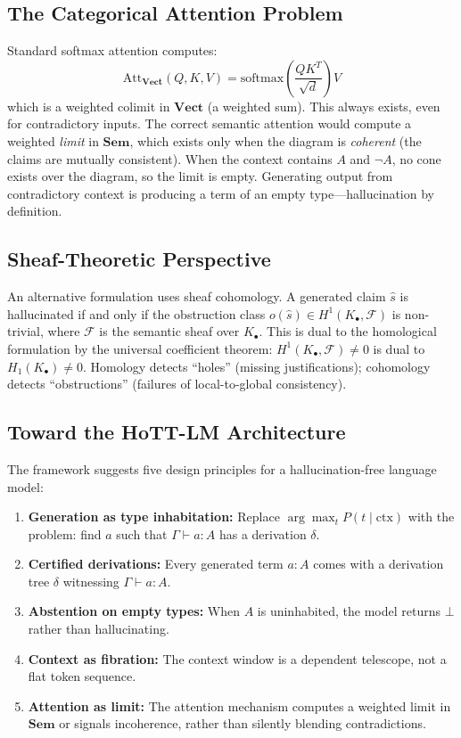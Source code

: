 \documentclass[11pt,a4paper]{article}
\theoremstyle{plain}
\theoremstyle{definition}
\theoremstyle{remark}
\newcommand{\Sem}{\mathbf{Sem}}
\newcommand{\Vect}{\mathbf{Vect}}
\newcommand{\Att}{\mathrm{Att}}
\begin{document}
\subsection{The Categorical Attention Problem}

Standard softmax attention computes:
\[
\Att_{\Vect}(Q, K, V) = \mathrm{softmax}\left(\frac{QK^T}{\sqrt{d}}\right) V
\]
which is a weighted colimit in $\Vect$ (a weighted sum). This always exists, even for contradictory inputs. The correct semantic attention would compute a weighted \emph{limit} in $\Sem$, which exists only when the diagram is \emph{coherent} (the claims are mutually consistent). When the context contains $A$ and $\neg A$, no cone exists over the diagram, so the limit is empty. Generating output from contradictory context is producing a term of an empty type---hallucination by definition.

\subsection{Sheaf-Theoretic Perspective}

An alternative formulation uses sheaf cohomology. A generated claim $\hat{s}$ is hallucinated if and only if the obstruction class $o(\hat{s}) \in H^1(K_\bullet, \mathcal{F})$ is non-trivial, where $\mathcal{F}$ is the semantic sheaf over $K_\bullet$. This is dual to the homological formulation by the universal coefficient theorem: $H^1(K_\bullet, \mathcal{F}) \neq 0$ is dual to $H_1(K_\bullet) \neq 0$. Homology detects ``holes'' (missing justifications); cohomology detects ``obstructions'' (failures of local-to-global consistency).

\subsection{Toward the HoTT-LM Architecture}

The framework suggests five design principles for a hallucination-free language model:

\begin{enumerate}[nosep]
  \item \textbf{Generation as type inhabitation:} Replace $\arg\max_t P(t \mid \mathrm{ctx})$ with the problem: find $a$ such that $\Gamma \vdash a : A$ has a derivation $\delta$.
  \item \textbf{Certified derivations:} Every generated term $a : A$ comes with a derivation tree $\delta$ witnessing $\Gamma \vdash a : A$.
  \item \textbf{Abstention on empty types:} When $A$ is uninhabited, the model returns $\bot$ rather than hallucinating.
  \item \textbf{Context as fibration:} The context window is a dependent telescope, not a flat token sequence.
  \item \textbf{Attention as limit:} The attention mechanism computes a weighted limit in $\Sem$ or signals incoherence, rather than silently blending contradictions.
\end{enumerate}
\end{document}
